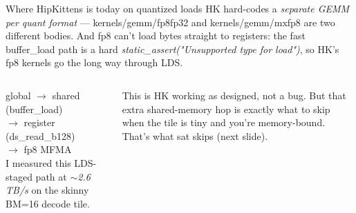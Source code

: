 \documentclass[pdf,aspectratio=169]{beamer}
\newcommand{\empr}[1]{{\color{cardinalred}\emph{#1}}}
\newcommand{\examplebox}[2]{%
\begin{tcolorbox}[colframe=darkcardinal,colback=boxgray,title={#1}]
#2
\end{tcolorbox}}
\newcommand{\mc}[1]{{\ttfamily\small #1}}
\begin{document}
\begin{frame}{Where HipKittens is today on quantized loads}
\small
HK hard-codes a \empr{separate GEMM per quant format} --- \mc{kernels/gemm/fp8fp32} and \mc{kernels/gemm/mxfp8} are two different bodies. And fp8 can't load bytes straight to registers: the fast \mc{buffer\_load} path is a hard \empr{\mc{static\_assert("Unsupported type for load")}}, so HK's fp8 kernels go the long way through LDS.
\vspace{0.3ex}
\begin{columns}
\begin{column}{0.55\textwidth}
\examplebox{HK's fp8 decode path (staged through LDS)}{\small
\mc{global $\to$ shared} (\mc{buffer\_load}) \\
\mc{$\to$ register} (\mc{ds\_read\_b128}) \\
\mc{$\to$ fp8 MFMA}
\vspace{0.5ex}\\
I measured this LDS-staged path at \empr{$\sim$2.6\,TB/s} on the skinny BM=16 decode tile.}
\end{column}
\begin{column}{0.45\textwidth}
\examplebox{The LDS hop is the thing to cut}{\small
This is HK working as designed, not a bug. But that extra shared-memory hop is exactly what to skip when the tile is tiny and you're memory-bound. That's what \mc{sat} skips (next slide).}
\end{column}
\end{columns}
\end{frame}
\end{document}
